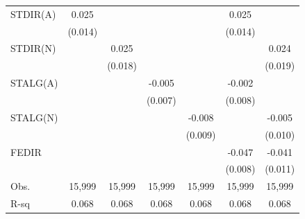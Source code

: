 {\begin{tabular}{l*{6}{c}}
STDIR(A)            &       0.025\sym{*}  &                     &                     &                     &       0.025\sym{*}  &                     \\
                    &     (0.014)         &                     &                     &                     &     (0.014)         &                     \\
\addlinespace
STDIR(N)            &                     &       0.025         &                     &                     &                     &       0.024         \\
                    &                     &     (0.018)         &                     &                     &                     &     (0.019)         \\
\addlinespace
STALG(A)            &                     &                     &      -0.005         &                     &      -0.002         &                     \\
                    &                     &                     &     (0.007)         &                     &     (0.008)         &                     \\
\addlinespace
STALG(N)            &                     &                     &                     &      -0.008         &                     &      -0.005         \\
                    &                     &                     &                     &     (0.009)         &                     &     (0.010)         \\
\addlinespace
FEDIR               &                     &                     &                     &                     &      -0.047\sym{***}&      -0.041\sym{***}\\
                    &                     &                     &                     &                     &     (0.008)         &     (0.011)         \\
\midrule
Obs.                &      15,999         &      15,999         &      15,999         &      15,999         &      15,999         &      15,999         \\
R-sq                &       0.068         &       0.068         &       0.068         &       0.068         &       0.068         &       0.068         \\
\bottomrule
\end{tabular}
}
